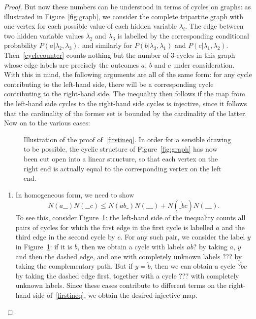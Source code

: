 \documentclass[aps,english,superscriptaddress,twocolumn,twoside,prl]{revtex4-1}%
\newcommand{\beq}{\begin{equation}}
\newcommand{\eeq}{\end{equation}}
\theoremstyle{plain}
\theoremstyle{definition}
\theoremstyle{remark}
\numberwithin{equation}{section}
\newcommand{\nb}{\ensuremath{\mathring{b}}}
\begin{document}
\begin{proof}
But now these numbers can be understood in terms of cycles on graphs: as illustrated in Figure~\ref{fig:graph}, we consider the complete tripartite graph with one vertex for each possible value of each hidden variable $\lambda_i$. The edge between two hidden variable values $\lambda_2$ and $\lambda_3$ is labelled by the corresponding conditional probability $P(a|\lambda_2,\lambda_3)$, and similarly for $P(b|\lambda_3,\lambda_1)$ and $P(c|\lambda_1,\lambda_2)$. Then~\eqref{cyclecounter} counts nothing but the number of $3$-cycles in this graph whose edge labels are precisely the outcomes $a$, $b$ and $c$ under consideration. With this in mind, the following arguments are all of the same form: for any cycle contributing to the left-hand side, there will be a corresponding cycle contributing to the right-hand side. The inequality then follows if the map from the left-hand side cycles to the right-hand side cycles is injective, since it follows that the cardinality of the former set is bounded by the cardinality of the latter. Now on to the various cases:


\begin{figure}[h]
\centering
{}
\caption{Illustration of the proof of~\eqref{firstineq}. In order for a sensible drawing to be possible, the cyclic structure of Figure~\ref{fig:graph} has now been cut open into a linear structure, so that each vertex on the right end is actually equal to the corresponding vertex on the left end.}
\label{fig:aillu}
\end{figure}
\begin{enumerate}
\item In homogeneous form, we need to show
\beq
\label{firstineq}
N(a\_\_) N(\_\_c) \leq N(ab\_) N(\_\_\_) + N(\_\nb c) N(\_\_\_).
\eeq
To see this, consider Figure~\ref{fig:aillu}: the left-hand side of the inequality counts all pairs of cycles for which the first edge in the first cycle is labelled $a$ and the third edge in the second cycle by $c$. For any such pair, we consider the label $y$ in Figure~\ref{fig:aillu}: if it is $b$, then we obtain a cycle with labels $ab?$ by taking $a$, $y$ and then the dashed edge, and one with completely unknown labels $???$ by taking the complementary path. But if $y=\nb$, then we can obtain a cycle $?\mathring{b}c$ by taking the dashed edge first, together with a cycle $???$ with completely unknown labels. Since these cases contribute to different terms on the right-hand side of~\eqref{firstineq}, we obtain the desired injective map.


\end{enumerate}
\end{proof}
\end{document}

